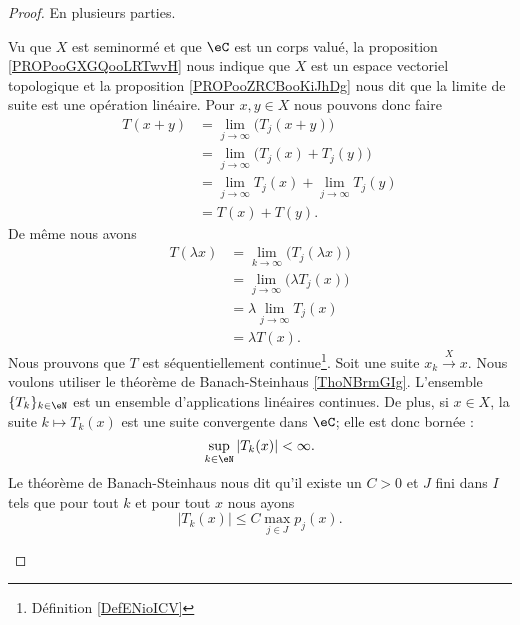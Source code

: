 \begin{proof}
	En plusieurs parties.
	\begin{subproof}
		\spitem[Linéaire]
		Vu que \( X\) est seminormé et que \( \eC\) est un corps valué, la proposition \ref{PROPooGXGQooLRTwvH} nous indique que \( X\) est un espace vectoriel topologique et la proposition \ref{PROPooZRCBooKiJhDg} nous dit que la limite de suite est une opération linéaire. Pour \( x,y\in X\) nous pouvons donc faire
		\begin{subequations}
			\begin{align}
				T(x+y) & =\lim_{j\to \infty} \big( T_j(x+y) \big)             \\
				       & =\lim_{j\to \infty} \big( T_j(x)+T_j(y) \big)        \\
				       & =\lim_{j\to \infty} T_j(x)+\lim_{j\to \infty} T_j(y) \\
				       & =T(x)+T(y).
			\end{align}
		\end{subequations}
		De même nous avons
		\begin{subequations}
			\begin{align}
				T(\lambda x) & =\lim_{k\to \infty} \big( T_j(\lambda x) \big) \\
				             & =\lim_{j\to \infty} \big( \lambda T_j(x) \big) \\
				             & =\lambda\lim_{j\to \infty} T_j(x)              \\
				             & =\lambda T(x).
			\end{align}
		\end{subequations}
		Nous prouvons que \( T\) est séquentiellement continue\footnote{Définition \ref{DefENioICV}}. Soit une suite \( x_k\stackrel{X}{\longrightarrow}x\). Nous voulons utiliser le théorème de Banach-Steinhaus \ref{ThoNBrmGIg}. L'ensemble \( \{ T_k \}_{k\in \eN}\) est un ensemble d'applications linéaires continues. De plus, si \( x\in X\), la suite \( k\mapsto T_k(x)\) est une suite convergente dans \( \eC\); elle est donc bornée :
		\begin{equation}
			\sup_{k\in \eN}| T_k(x) |<\infty.
		\end{equation}
		Le théorème de Banach-Steinhaus nous dit qu'il existe un \( C>0\) et \( J\) fini dans \( I\) tels que pour tout \( k\) et pour tout \( x\) nous ayons
		\begin{equation}
			| T_k(x) |\leq C\max_{j\in J} p_j(x).
		\end{equation}

\end{subproof}
\end{proof}
